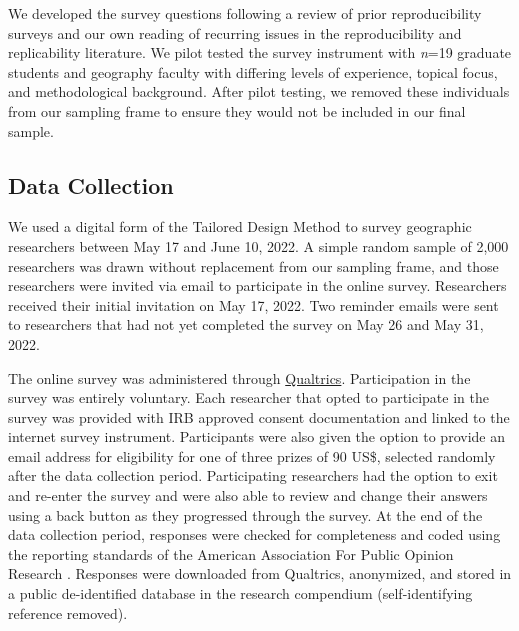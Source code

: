 \documentclass[]{interact}
\theoremstyle{plain}%
\theoremstyle{definition}
\theoremstyle{remark}
\begin{document}
We developed the survey questions following a review of prior reproducibility surveys \citep[e.g.,][]{fanelli2009many,baker20161, konkol2019} and our own reading of recurring issues in the reproducibility and replicability literature. 
We pilot tested the survey instrument with \textit{n}=19 graduate students and geography faculty with differing levels of experience, topical focus, and methodological background. 
After pilot testing, we removed these individuals from our sampling frame to ensure they would not be included in our final sample.

\subsection*{Data Collection}
We used a digital form of the Tailored Design Method \citep{dillman2014internet} to survey geographic researchers between May 17 and June 10, 2022.
A simple random sample of 2,000 researchers was drawn without replacement from our sampling frame, and those researchers were invited via email to participate in the online survey. 
Researchers received their initial invitation on May 17, 2022. 
Two reminder emails were sent to researchers that had not yet completed the survey on May 26 and May 31, 2022.

The online survey was administered through \href{https://www.qualtrics.com/}{Qualtrics}. 
Participation in the survey was entirely voluntary. 
Each researcher that opted to participate in the survey was provided with IRB approved consent documentation and linked to the internet survey instrument. 
Participants were also given the option to provide an email address for eligibility for one of three  prizes of 90 US\$, selected randomly after the data collection period.
Participating researchers had the option to exit and re-enter the survey and were also able to review and change their answers using a back button as they progressed through the survey.
At the end of the data collection period, responses were checked for completeness and coded using the reporting standards of the American Association For Public Opinion Research \citep{aaporstandards}.
Responses were downloaded from Qualtrics, anonymized, and stored in a public de-identified database in the research compendium (self-identifying reference removed).


\end{document}
